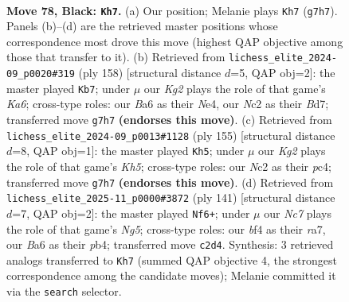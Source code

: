 \documentclass[11pt]{article}
\begin{document}
\clearpage

\begin{figure}[p]\centering
\begin{subfigure}{0.46\textwidth}\centering
\resizebox{\linewidth}{!}{%
\newchessgame
\chessboard[
  setfen={8/6k1/b7/8/5B2/8/2n2PK1/8 b - - 2 78},
  showmover=false,
  pgfstyle=straightmove, color=movearrow, markmove={g7-h7}
]}
\caption{}
\end{subfigure}\hfill
\begin{subfigure}{0.46\textwidth}\centering
\resizebox{\linewidth}{!}{%
\newchessgame
\chessboard[
  setfen={8/3B4/K7/7p/4N2k/8/8/6b1 w - - 32 80},
  showmover=false,
  pgfstyle=straightmove, color=movearrow, markmove={a6-b7}
]}
\caption{}
\end{subfigure}
\\[4pt]
\begin{subfigure}{0.46\textwidth}\centering
\resizebox{\linewidth}{!}{%
\newchessgame
\chessboard[
  setfen={8/b7/8/5K2/2P2P1k/8/8/8 b - - 0 78},
  showmover=false,
  pgfstyle=straightmove, color=movearrow, markmove={h4-h5}
]}
\caption{}
\end{subfigure}\hfill
\begin{subfigure}{0.46\textwidth}\centering
\resizebox{\linewidth}{!}{%
\newchessgame
\chessboard[
  setfen={8/R7/6k1/3K4/1P1P2n1/8/8/8 b - - 0 71},
  showmover=false,
  pgfstyle=straightmove, color=movearrow, markmove={g4-f6}
]}
\caption{}
\end{subfigure}
\caption{\textbf{Move 78, Black: \texttt{Kh7}.} (a) Our position; Melanie plays \texttt{Kh7} (\texttt{g7h7}). Panels (b)--(d) are the retrieved master positions whose correspondence most drove this move (highest QAP objective among those that transfer to it). (b) Retrieved from \texttt{lichess\_elite\_2024-09\_p0020\#319} (ply 158) [structural distance $d$=5, QAP obj=2]: the master played \texttt{Kb7}; under $\mu$ our \emph{Kg2} plays the role of that game's \emph{Ka6}; cross-type roles: our \emph{B}a6 as their \emph{N}e4, our \emph{N}c2 as their \emph{B}d7; transferred move \texttt{g7h7} \textbf{(endorses this move)}. (c) Retrieved from \texttt{lichess\_elite\_2024-09\_p0013\#1128} (ply 155) [structural distance $d$=8, QAP obj=1]: the master played \texttt{Kh5}; under $\mu$ our \emph{Kg2} plays the role of that game's \emph{Kh5}; cross-type roles: our \emph{N}c2 as their \emph{p}c4; transferred move \texttt{g7h7} \textbf{(endorses this move)}. (d) Retrieved from \texttt{lichess\_elite\_2025-11\_p0000\#3872} (ply 141) [structural distance $d$=7, QAP obj=2]: the master played \texttt{Nf6+}; under $\mu$ our \emph{Nc7} plays the role of that game's \emph{Ng5}; cross-type roles: our \emph{b}f4 as their \emph{r}a7, our \emph{B}a6 as their \emph{p}b4; transferred move \texttt{c2d4}. Synthesis: 3 retrieved analogs transferred to \texttt{Kh7} (summed QAP objective 4, the strongest correspondence among the candidate moves); Melanie committed it via the \texttt{search} selector.}
\label{fig:thought-m155}
\end{figure}
\end{document}
